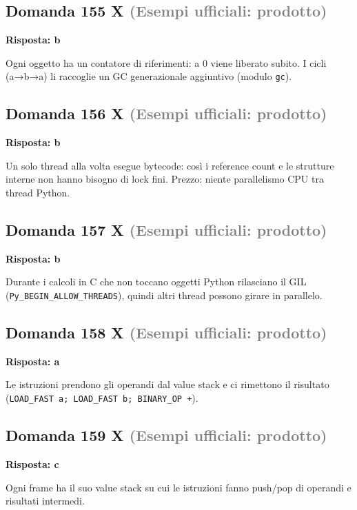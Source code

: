 \documentclass[a4paper,11pt]{article}
\begin{document}
\subsection*{Domanda 155 X \hfill {\small \textcolor{gray}{(Esempi ufficiali: prodotto)}}}
\textbf{Risposta: b}\par
Ogni oggetto ha un contatore di riferimenti: a 0 viene liberato subito. I cicli (a→b→a) li raccoglie un GC generazionale aggiuntivo (modulo \texttt{gc}).



\subsection*{Domanda 156 X \hfill {\small \textcolor{gray}{(Esempi ufficiali: prodotto)}}}
\textbf{Risposta: b}\par
Un solo thread alla volta esegue bytecode: così i reference count e le strutture interne non hanno bisogno di lock fini. Prezzo: niente parallelismo CPU tra thread Python.



\subsection*{Domanda 157 X \hfill {\small \textcolor{gray}{(Esempi ufficiali: prodotto)}}}
\textbf{Risposta: b}\par
Durante i calcoli in C che non toccano oggetti Python rilasciano il GIL (\texttt{Py\_BEGIN\_ALLOW\_THREADS}), quindi altri thread possono girare in parallelo.



\subsection*{Domanda 158 X \hfill {\small \textcolor{gray}{(Esempi ufficiali: prodotto)}}}
\textbf{Risposta: a}\par
Le istruzioni prendono gli operandi dal value stack e ci rimettono il risultato (\texttt{LOAD\_FAST a; LOAD\_FAST b; BINARY\_OP +}).



\subsection*{Domanda 159 X \hfill {\small \textcolor{gray}{(Esempi ufficiali: prodotto)}}}
\textbf{Risposta: c}\par
Ogni frame ha il suo value stack su cui le istruzioni fanno push/pop di operandi e risultati intermedi.
\end{document}
